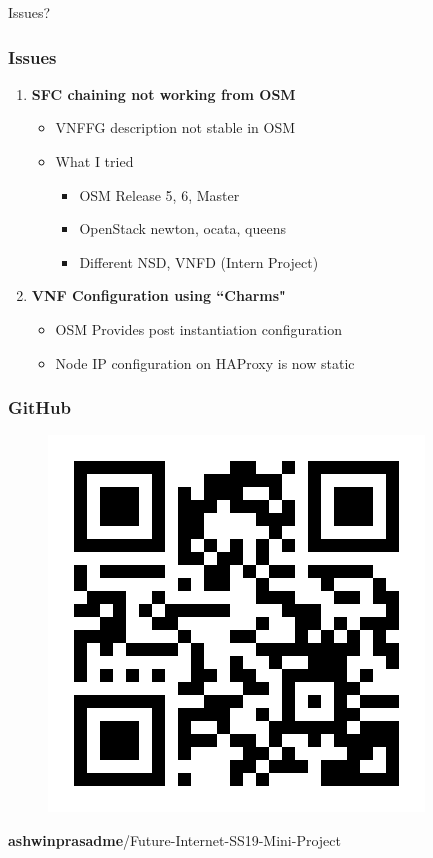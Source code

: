 \documentclass{beamer}
\begin{document}
\begin{frame}

\Huge{\centerline{Issues?}}

\end{frame}


\begin{frame}
\frametitle{Issues}

\begin{enumerate}
	\item \textbf{SFC chaining not working from OSM}\\
	\begin{itemize}
		\item VNFFG description not stable in OSM
		\item What I tried
		\begin{itemize}
			\item OSM Release 5, 6, Master
			\item OpenStack newton, ocata, queens
			\item Different NSD, VNFD (Intern Project)
		\end{itemize}
	\end{itemize} \pause

	\item \textbf{VNF Configuration using ``Charms"}\\
	\begin{itemize}
		\item OSM Provides post instantiation configuration 
		\item Node IP configuration on HAProxy is now static
	\end{itemize} 
	
\end{enumerate}

\end{frame}

\begin{frame}
\frametitle{GitHub}

\begin{figure}
	\centering
	\includegraphics[width=0.5\linewidth]{images/gihubqr}
	\label{fig:gihubqr}
\end{figure}

\large{\centerline{\textbf{ashwinprasadme}/Future-Internet-SS19-Mini-Project}}

\end{frame}
\end{document}
